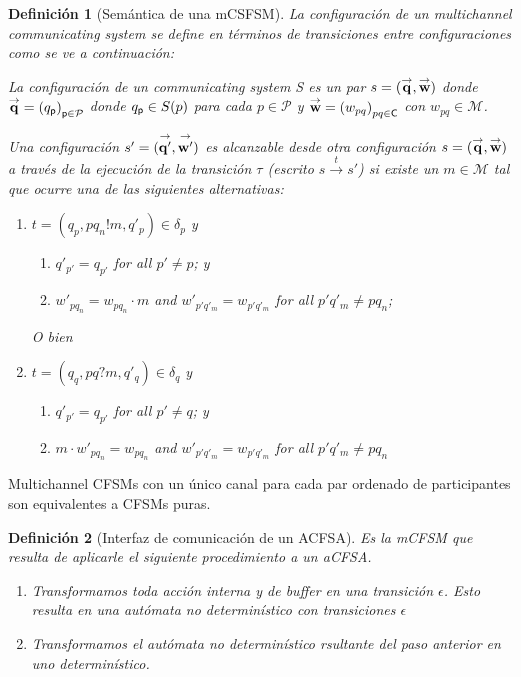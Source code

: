 \documentclass[paper=a4, fontsize=11pt, spanish]{scrartcl} %
\numberwithin{equation}{section} %
\numberwithin{figure}{section} %
\numberwithin{table}{section} %
\newtheorem{definition}{Definición}
\begin{document}
\begin{definition}[Semántica de una mCSFSM]La configuración de un multichannel communicating system se define en términos de transiciones entre configuraciones como se ve a continuación:

  La configuración de un communicating system S es un par
  $s = (\overset{\rightarrow}{\mathbf{q}}, \overset{\rightarrow}{\mathbf{w}})$ donde
  $\overset{\rightarrow}{\mathbf{q}} = \left(q_{\mathsf{p}}\right)_{\mathsf{p} \in \mathcal{P}}$ donde
  $q_{\mathsf{p}} \in S(p)$ para cada $p \in \mathcal{P}$ y
  $\overset{\rightarrow}{\mathbf{w}} = \left(w_{pq}\right)_{pq \in \mathbf{\mathsf{C}}}$ con
  $w_{pq} \in \mathcal{M} $.
  
  Una configuración $s' = (\overset{\rightarrow}{\mathbf{q'}}, \overset{\rightarrow}{\mathbf{w'}})$ es \emph{alcanzable} desde otra
  configuración $s = (\overset{\rightarrow}{\mathbf{q}}, \overset{\rightarrow}{\mathbf{w}})$ a través de la \emph{ejecución de la
    transición}  $\tau $ (escrito $s \overset{t}{\rightarrow} s'$) si existe un
   $m \in \mathcal{M}$ tal que ocurre una de las siguientes alternativas:
	\begin{enumerate}
		\item $t = (q_p, pq_n!m,  q'_p) \in \delta_p$ y 
			\begin{enumerate}
				\item $q'_{p'} = q_{p'}$ for all $p' \neq p$; y
				\item $w'_{pq_n} = w_{pq_n} \cdot m$ and $w'_{p'q'_m} = w_{p'q'_m}$ for all $p'q'_m \neq pq_n$; \\
			\end{enumerate}
                O bien
		\item $t = (q_q, pq?m,  q'_q) \in \delta_q$ y 
			\begin{enumerate}
				\item $q'_{p'} = q_{p'}$ for all $p' \not= q$; y
				\item $m \cdot w'_{pq_n} = w_{pq_n}$ and $w'_{p'q'_m} = w_{p'q'_m}$ for all $p'q'_m \neq pq_n$
			\end{enumerate}
	\end{enumerate}
\end{definition}

Multichannel CFSMs  con un único canal para cada par ordenado de participantes son equivalentes a CFSMs puras.

\begin{definition}[Interfaz de comunicación de un ACFSA] Es la mCFSM que resulta de aplicarle el siguiente procedimiento a un aCFSA.
\begin{enumerate}
    \item Transformamos toda acción interna y de buffer en una transición $\epsilon$. Esto resulta en una autómata no determinístico con transiciones $\epsilon$
    \item Transformamos el autómata no determinístico rsultante del paso anterior en uno determinístico.
\end{enumerate}
\end{definition}
\end{document}
